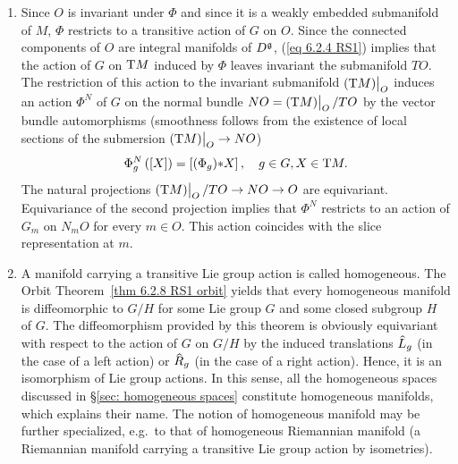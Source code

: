\begin{rem}[{{\cite[Rem.~6.2.10]{RS1}}}]
\begin{enumerate}
        On the other hand, the isotropy representation restricted to $\T_mO$ can be brought to the following normal form. By the Orbit Theorem~\ref{thm 6.2.8 RS1 orbit}, the map $\Phi^m_{\ast e}:\frakg\to \T_mM$ has image $\T_mO$. By point 3 of Proposition~\ref{prop 6.2.2 RS1} it has kernel $\frakg_m$. Hence, this mapping induces a natural vector space isomorphism
        \[\T_mO\cong \frakg\slash\frakg_m.\]
        In view of (\ref{eq 6.2.1 RS1}), this implies that this isomorphism intertwines the representation of $G_m$ on $\frakg\slash\frakg_m$ induced by the adjoint representation with the isotropy representation on $\T_mO$.
        \item Since $O$ is invariant under $\Phi$ and since it is a weakly embedded submanifold of $M$, $\Phi$ restricts to a transitive action of $G$ on $O$. Since the connected components of $O$ are integral manifolds of $D^{\mathfrak{g}}$, (\ref{eq 6.2.4 RS1}) implies that the action of $G$ on $\mathrm{T} M$ induced by $\Phi$ leaves invariant the submanifold $TO$. The restriction of this action to the invariant submanifold $\restr{(\T M)}{O}$ induces an action $\Phi^N$ of $G$ on the normal bundle $NO=\restr{(\T M)}{O}\slash TO$ by the vector bundle automorphisms (smoothness follows from the existence of local sections of the submersion $\restr{(\T M)}{O}\to NO$)
        \[\Phi_g^N\left([X]\right)=\left[(\Phi_g){\ast}X\right],\quad g\in G,X\in \mathrm{T} M.\]
        The natural projections $\restr{(\T M)}{O}\slash TO\to NO\to O$ are equivariant. Equivariance of the second projection implies that $\Phi^N$ restricts to an action of $G_m$ on $N_mO$ for every $m\in O$. This action coincides with the slice representation at $m$.
        \item A manifold carrying a transitive Lie group action is called homogeneous. The Orbit Theorem~\ref{thm 6.2.8 RS1 orbit} yields that every homogeneous manifold is diffeomorphic to $G\slash H$ for some Lie group $G$ and some closed subgroup $H$ of $G$. The diffeomorphism provided by this theorem is obviously equivariant with respect to the action of $G$ on $G\slash H$ by the induced translations $\wh{L}_g$ (in the case of a left action) or $\wh{R}_g$ (in the case of a right action). Hence, it is an isomorphism of Lie group actions. In this sense, all the homogeneous spaces discussed in \S\ref{sec: homogeneous spaces} constitute homogeneous manifolds, which explains their name. The notion of homogeneous manifold may be further specialized, e.g.~to that of homogeneous Riemannian manifold (a Riemannian manifold carrying a transitive Lie group action by isometries).
    \end{enumerate}
\end{rem}





